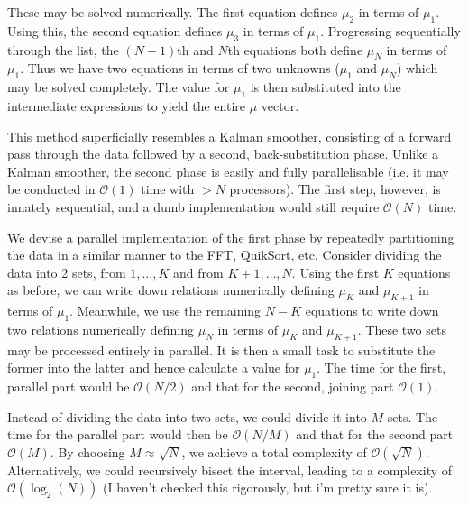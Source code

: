 \documentclass{article}
\begin{document}
These may be solved numerically. The first equation defines $\mu_2$ in terms of $\mu_1$. Using this, the second equation defines $\mu_3$ in terms of $\mu_1$. Progressing sequentially through the list, the $(N-1)$th and $N$th equations both define $\mu_N$ in terms of $\mu_1$. Thus we have two equations in terms of two unknowns ($\mu_1$ and $\mu_N$) which may be solved completely. The value for $\mu_1$ is then substituted into the intermediate expressions to yield the entire $\mu$ vector.

This method superficially resembles a Kalman smoother, consisting of a forward pass through the data followed by a second, back-substitution phase. Unlike a Kalman smoother, the second phase is easily and fully parallelisable (i.e. it may be conducted in $\mathcal{O}(1)$ time with $>N$ processors). The first step, however, is innately sequential, and a dumb implementation would still require $\mathcal{O}(N)$ time.

We devise a parallel implementation of the first phase by repeatedly partitioning the data in a similar manner to the FFT, QuikSort, etc. Consider dividing the data into 2 sets, from $1,\hdots,K$ and from $K+1,\hdots,N$. Using the first $K$ equations as before, we can write down relations numerically defining $\mu_K$ and $\mu_{K+1}$ in terms of $\mu_1$. Meanwhile, we use the remaining $N-K$ equations to write down two relations numerically defining $\mu_N$ in terms of $\mu_{K}$ and $\mu_{K+1}$. These two sets may be processed entirely in parallel. It is then a small task to substitute the former into the latter and hence calculate a value for $\mu_1$. The time for the first, parallel part would be $\mathcal{O}(N/2)$ and that for the second, joining part $\mathcal{O}(1)$.

Instead of dividing the data into two sets, we could divide it into $M$ sets. The time for the parallel part would then be $\mathcal{O}(N/M)$ and that for the second part $\mathcal{O}(M)$. By choosing $M \approx \sqrt{N}$, we achieve a total complexity of $\mathcal{O}(\sqrt{N})$. Alternatively, we could recursively bisect the interval, leading to a complexity of $\mathcal{O}(\log_2(N))$ (I haven't checked this rigorously, but i'm pretty sure it is).
\end{document}
